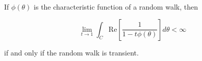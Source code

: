 If $\phi(\theta)$ is the characteristic function of a random walk, then

$$\lim_{t \to 1} \int_C \text{Re} \left[ \frac{1}{1 - t\phi(\theta)} \right] d\theta < \infty$$

if and only if the random walk is transient.
